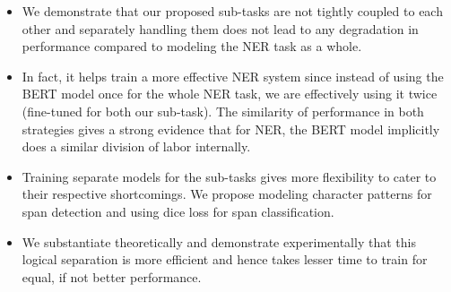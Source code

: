 \begin{itemize}
    \item We demonstrate that our proposed sub-tasks are not tightly coupled to each other and separately handling them does not lead to any degradation in performance compared to modeling the NER task as a whole. 
    
    \item In fact, it helps train a more effective NER system since instead of using the BERT model once for the whole NER task, we are effectively using it twice (fine-tuned for both our sub-task). The similarity of performance in both strategies gives a strong evidence that for NER, the BERT model implicitly does a similar division of labor internally.
    
    \item Training separate models for the sub-tasks gives more flexibility to cater to their respective shortcomings. We propose modeling character patterns for span detection and using dice loss for span classification.
    
    \item We substantiate theoretically and demonstrate experimentally that this logical separation is more efficient and hence takes lesser time to train for equal, if not better performance.
\end{itemize}
